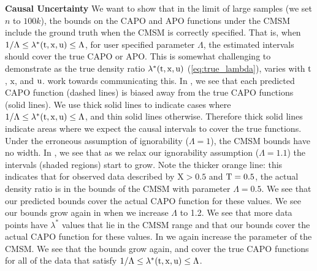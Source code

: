 \textbf{Causal Uncertainty}
We want to show that in the limit of large samples (we set $n$ to $100k$), the bounds on the CAPO and APO functions under the CMSM include the ground truth when the CMSM is correctly specified.
That is, when $1 / \Lambda \leq \lambda^*(\mathrm{t}, \mathrm{x}, \mathrm{u}) \leq \Lambda$, for user specified parameter $\Lambda$, the estimated intervals should cover the true CAPO or APO.
This is somewhat challenging to demonstrate as the true density ratio $\lambda^*(\mathrm{t}, \mathrm{x}, \mathrm{u})$ (\cref{eq:true_lambda}), varies with $\mathrm{t}$, $\mathrm{x}$, and $\mathrm{u}$.
 work towards communicating this.
In , we see that each predicted CAPO function (dashed lines) is biased away from the true CAPO functions (solid lines). We use thick solid lines to indicate cases where $1 / \Lambda \leq \lambda^*(\mathrm{t}, \mathrm{x}, \mathrm{u}) \leq \Lambda$, and thin solid lines otherwise. Therefore thick solid lines indicate areas where we expect the causal intervals to cover the true functions.
Under the erroneous assumption of ignorability ($\Lambda=1$), the CMSM bounds have no width.
In , we see that as we relax our ignorability assumption ($\Lambda=1.1$) the intervals (shaded regions) start to grow.
Note the thicker orange line: this indicates that for observed data described by $\mathrm{X} > 0.5$ and $\mathrm{T}=0.5$, the actual density ratio is in the bounds of the CMSM with parameter $\Lambda=0.5$.
We see that our predicted bounds cover the actual CAPO function for these values.
We see our bounds grow again in  when we increase $\Lambda$ to 1.2.
We see that more data points have $\lambda^*$ values that lie in the CMSM range and that our bounds cover the actual CAPO function for these values. 
In  we again increase the parameter of the CMSM. We see that the bounds grow again, and cover the true CAPO functions for all of the data that satisfy $1 / \Lambda \leq \lambda^*(\mathrm{t}, \mathrm{x}, \mathrm{u}) \leq \Lambda$.

